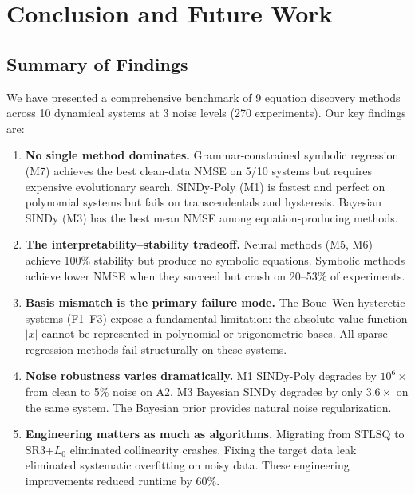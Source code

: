 \section{Conclusion and Future Work}
\label{sec:conclusion}

\subsection{Summary of Findings}

We have presented a comprehensive benchmark of 9 equation discovery methods across 10 dynamical systems at 3 noise levels (270 experiments). Our key findings are:

\begin{enumerate}
    \item \textbf{No single method dominates.} Grammar-constrained symbolic regression (M7) achieves the best clean-data NMSE on 5/10 systems but requires expensive evolutionary search. SINDy-Poly (M1) is fastest and perfect on polynomial systems but fails on transcendentals and hysteresis. Bayesian SINDy (M3) has the best mean NMSE among equation-producing methods.
    
    \item \textbf{The interpretability--stability tradeoff.} Neural methods (M5, M6) achieve 100\% stability but produce no symbolic equations. Symbolic methods achieve lower NMSE when they succeed but crash on 20--53\% of experiments.
    
    \item \textbf{Basis mismatch is the primary failure mode.} The Bouc--Wen hysteretic systems (F1--F3) expose a fundamental limitation: the absolute value function $|x|$ cannot be represented in polynomial or trigonometric bases. All sparse regression methods fail structurally on these systems.
    
    \item \textbf{Noise robustness varies dramatically.} M1 SINDy-Poly degrades by $10^6\times$ from clean to 5\% noise on A2. M3 Bayesian SINDy degrades by only $3.6\times$ on the same system. The Bayesian prior provides natural noise regularization.
    
    \item \textbf{Engineering matters as much as algorithms.} Migrating from STLSQ to SR3+$L_0$ eliminated collinearity crashes. Fixing the target data leak eliminated systematic overfitting on noisy data. These engineering improvements reduced runtime by 60\%.
\end{enumerate}

